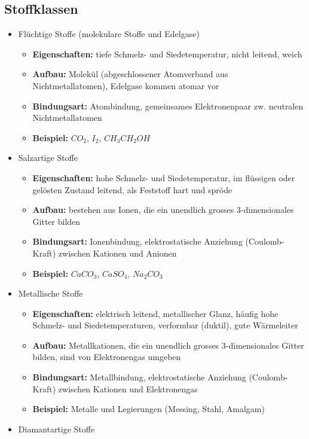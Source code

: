 \subsection{Stoffklassen}
\begin{itemize}
	\item Flüchtige Stoffe (molekulare Stoffe und Edelgase)
	\begin{itemize}
	    \item \textbf{Eigenschaften:} tiefe Schmelz- und Siedetemperatur, nicht leitend, weich
	    \item \textbf{Aufbau:} Molekül (abgeschlossener Atomverband aus Nichtmetallatomen), Edelgase kommen atomar vor
	    \item \textbf{Bindungsart:} Atombindung, gemeinsames Elektronenpaar zw. neutralen Nichtmetallatomen
	    \item \textbf{Beispiel:} $CO_2$, $I_2$, $CH_3CH_2OH$
	\end{itemize}
	\item Salzartige Stoffe
	\begin{itemize}
	    \item \textbf{Eigenschaften:} hohe Schmelz- und Siedetemperatur, im flüssigen oder gelösten Zustand leitend, als Feststoff hart und spröde
	    \item \textbf{Aufbau:} bestehen aus Ionen, die ein unendlich grosses 3-dimensionales Gitter bilden
	    \item \textbf{Bindungsart:} Ionenbindung, elektrostatische Anziehung (Coulomb-Kraft) zwischen Kationen und Anionen
	    \item \textbf{Beispiel:} $CaCO_3$, $CaSO_4$, $Na_2CO_3$
	\end{itemize}
	\item Metallische Stoffe
	\begin{itemize}
	    \item \textbf{Eigenschaften:} elektrisch leitend, metallischer Glanz, häufig hohe Schmelz- und Siedetemperaturen, verformbar (duktil), gute Wärmeleiter
	    \item \textbf{Aufbau:} Metallkationen, die ein unendlich grosses 3-dimensionales Gitter bilden, sind von Elektronengas umgeben
	    \item \textbf{Bindungsart:} Metallbindung, elektrostatische Anziehung (Coulomb-Kraft) zwischen Kationen und Elektronengas
	    \item \textbf{Beispiel:} Metalle und Legierungen (Messing, Stahl, Amalgam)
	\end{itemize}
	\item Diamantartige Stoffe

\end{itemize}
